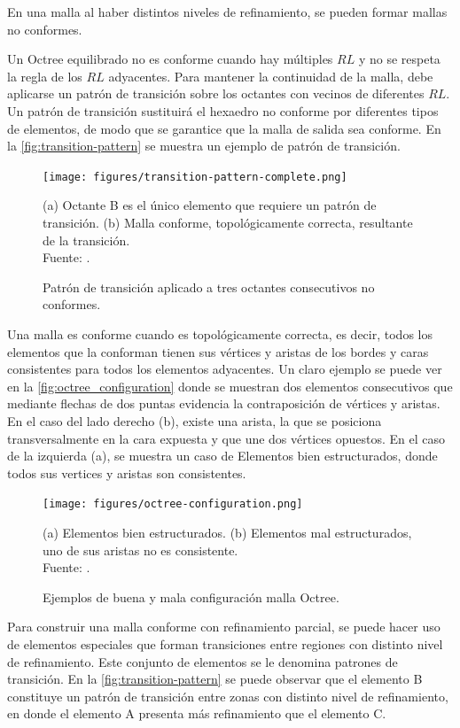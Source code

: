 En una malla al haber distintos niveles de refinamiento, se pueden formar mallas no conformes. 

Un Octree equilibrado no es conforme cuando hay múltiples $RL$ y no se respeta la regla de los $RL$ adyacentes. Para mantener la continuidad de la malla, debe aplicarse un patrón de transición sobre los octantes con vecinos de diferentes $RL$. Un patrón de transición sustituirá el hexaedro no conforme por diferentes tipos de elementos, de modo que se garantice que la malla de salida sea conforme. En la \autoref{fig:transition-pattern} se muestra un ejemplo de patrón de transición.


\begin{figure}[!ht]
	\centering
	\texttt{[image: figures/transition-pattern-complete.png]}
	\caption{\label{fig:transition-pattern} Patrón de transición aplicado a tres octantes consecutivos no conformes.} 
	\small{(a) Octante B es el único elemento que requiere un patrón de transición. (b) Malla conforme, topológicamente correcta, resultante de la transición.} \\ Fuente: \cite{lobos2015mixed}.
\end{figure}

Una malla es conforme cuando es topológicamente correcta, es decir, todos los elementos que la conforman tienen sus vértices y aristas de los bordes y caras consistentes para todos los elementos adyacentes. Un claro ejemplo se puede ver en la \autoref{fig:octree_configuration} donde se muestran dos elementos consecutivos que mediante flechas de dos puntas evidencia la contraposición de vértices y aristas. En el caso del lado derecho (b), existe una arista, la que se posiciona transversalmente en la cara expuesta y que une dos vértices opuestos. En el caso de la izquierda (a), se muestra un caso de Elementos bien estructurados, donde todos sus vertices y aristas son consistentes.

\begin{figure}[!ht]
	\centering
	\texttt{[image: figures/octree-configuration.png]}
	\caption{\label{fig:octree_configuration} Ejemplos de buena y mala configuración malla Octree.} 
	\small{(a) Elementos bien estructurados. (b) Elementos mal estructurados, uno de sus aristas no es consistente.} \\ Fuente: \cite{lobos2015mixed}.
\end{figure}

Para construir una malla conforme con refinamiento parcial, se puede hacer uso de elementos especiales que forman transiciones entre regiones con distinto nivel de refinamiento. Este conjunto de elementos se le denomina patrones de transición. En la \autoref{fig:transition-pattern} se puede observar que el elemento B constituye un patrón de transición entre zonas con distinto nivel de refinamiento, en donde el elemento A presenta más refinamiento que el elemento C.

